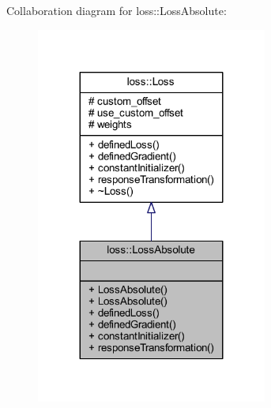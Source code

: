 Collaboration diagram for loss\+:\+:Loss\+Absolute\+:\nopagebreak
\begin{figure}[H]
\begin{center}
\leavevmode
\includegraphics[width=215pt]{classloss_1_1_loss_absolute__coll__graph}
\end{center}
\end{figure}
